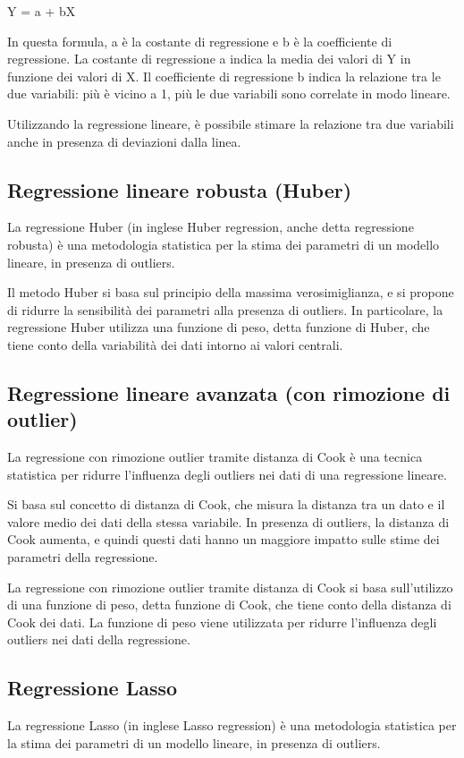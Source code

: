 Y = a + bX

In questa formula, a è la costante di regressione e b è la coefficiente di regressione. La costante di regressione a indica la media dei valori di Y in funzione dei valori di X. Il coefficiente di regressione b indica la relazione tra le due variabili: più è vicino a 1, più le due variabili sono correlate in modo lineare.

Utilizzando la regressione lineare, è possibile stimare la relazione tra due variabili anche in presenza di deviazioni dalla linea.

\subsection{Regressione lineare robusta (Huber)}\label{ssec:regressione-huber}
La regressione Huber (in inglese Huber regression, anche detta regressione robusta) è una metodologia statistica per la stima dei parametri di un modello lineare, in presenza di outliers.

Il metodo Huber si basa sul principio della massima verosimiglianza, e si propone di ridurre la sensibilità dei parametri alla presenza di outliers. In particolare, la regressione Huber utilizza una funzione di peso, detta funzione di Huber, che tiene conto della variabilità dei dati intorno ai valori centrali.

\subsection{Regressione lineare avanzata (con rimozione di outlier)}\label{ssec:regressione-cook}
La regressione con rimozione outlier tramite distanza di Cook è una tecnica statistica per ridurre l'influenza degli outliers nei dati di una regressione lineare.

Si basa sul concetto di distanza di Cook, che misura la distanza tra un dato e il valore medio dei dati della stessa variabile. In presenza di outliers, la distanza di Cook aumenta, e quindi questi dati hanno un maggiore impatto sulle stime dei parametri della regressione.

La regressione con rimozione outlier tramite distanza di Cook si basa sull'utilizzo di una funzione di peso, detta funzione di Cook, che tiene conto della distanza di Cook dei dati. La funzione di peso viene utilizzata per ridurre l'influenza degli outliers nei dati della regressione.

\subsection{Regressione Lasso}\label{ssec:regressione-lasso}
La regressione Lasso (in inglese Lasso regression) è una metodologia statistica per la stima dei parametri di un modello lineare, in presenza di outliers.


